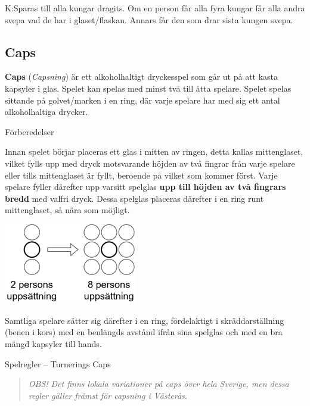 K:Sparas till alla kungar dragits. Om en person får alla fyra kungar får alla andra svepa vad de har i glaset/flaskan.
Annars får den som drar sista kungen svepa.
\subsection*{\textbf{Caps}}

\textbf{Caps} (\emph{Capsning}) är ett alkoholhaltigt dryckesspel som
går ut på att kasta kapsyler i glas. Spelet kan spelas med minst två
till åtta spelare. Spelet spelas sittande på golvet/marken i en ring,
där varje spelare har med sig ett antal alkoholhaltiga drycker.

Förberedelser

Innan spelet börjar placeras ett glas i mitten av ringen, detta kallas
mittenglaset, vilket fylls upp med dryck motsvarande höjden av två
fingrar från varje spelare eller tills mittenglaset är fyllt, beroende
på vilket som kommer först. Varje spelare fyller därefter upp varsitt
spelglas \textbf{upp till höjden av två fingrars bredd} med valfri
dryck. Dessa spelglas placeras därefter i en ring runt mittenglaset, så
nära som möjligt.

\includegraphics[width=2.29167in,height=1.38819in]{media/CapsPositions.png}

Samtliga spelare sätter sig därefter i en ring, fördelaktigt i
skräddarställning (benen i kors) med en benlängds avstånd ifrån sina
spelglas och med en bra mängd kapsyler till hands.

Spelregler -- Turnerings Caps

\begin{quote}
\emph{OBS! Det finns lokala variationer på caps över hela Sverige, men
dessa regler gäller främst för capsning i Västerås.}
\end{quote}

